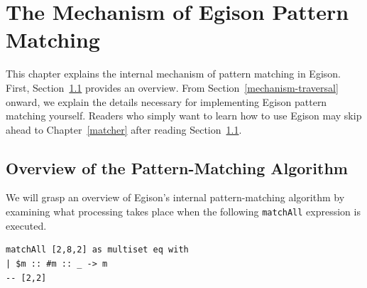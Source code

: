 \chapter{The Mechanism of Egison Pattern Matching}\label{mechanism}

This chapter explains the internal mechanism of pattern matching in Egison.
First, Section~\ref{mechanism-overview} provides an overview.
From Section~\ref{mechanism-traversal} onward, we explain the details necessary for implementing Egison pattern matching yourself.
Readers who simply want to learn how to use Egison may skip ahead to Chapter~\ref{matcher} after reading Section~\ref{mechanism-overview}.

\section{Overview of the Pattern-Matching Algorithm}\label{mechanism-overview}

We will grasp an overview of Egison's internal pattern-matching algorithm by examining what processing takes place when the following \lstinline{matchAll} expression is executed.
\begin{lstlisting}[language=egison,numbers=none]
matchAll [2,8,2] as multiset eq with
| $m :: #m :: _ -> m
-- [2,2]
\end{lstlisting}

